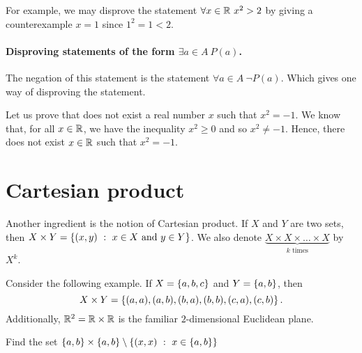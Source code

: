 For example, we may disprove the statement $\forall x \in \mathbb{R} \ x^2 > 2$ by
giving a counterexample $x = 1$ since $1^2 = 1 < 2$.

\paragraph{Disproving statements of the form $\exists a \in A \ P(a)$.}
The negation of this statement is the statement $\forall a \in A \ \lnot P(a)$.
Which gives one way of disproving the statement.

Let us prove that does not exist a real number $x$ such that $x^2 = -1$. We
know that, for all $x \in \mathbb{R}$, we have the inequality $x^2 \ge 0$ and so $x^2
\neq -1$. Hence, there does not exist $x \in \mathbb{R}$ such that $x^2 = -1$.

\section{Cartesian product}
Another ingredient is the notion of Cartesian product. If $X$ and $Y$ are two
sets, then $X \times Y = \set[x \in X \text{ and } y \in Y]{(x, y)}$. We also
denote $\underbrace{X \times X \times \dots \times X}_{k \text{ times}}$ by
$X^k$.

Consider the following example. If $X = \set{a, b, c}$ and $Y = \set{a, b}$,
then
\[
  X \times Y = \set{(a, a), (a, b), (b, a), (b, b), (c, a), (c, b)}.
\]
Additionally, $\mathbb{R}^2 = \mathbb{R} \times \mathbb{R}$ is the familiar $2$-dimensional Euclidean
plane.

\begin{exercise}
  Find the set $\set{a, b} \times \set{a, b} \setminus
  \set[x \in \set{a, b}]{(x, x)}$
\end{exercise}

